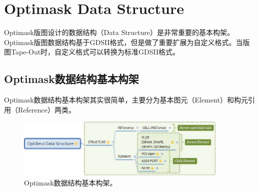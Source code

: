 
\resetdatestamp %


\chapter{Optimask Data Structure} \label{ChMaskDataStruct}

\pagestyle{fancy}
\fancyhead[RO,RE]{}
\fancyhead[LE]{\MakeUppercase{\leftmark}}
\fancyhead[LO]{\MakeUppercase{\rightmark}}
\fancyfoot[C]{\thepage}

Optimask版图设计的数据结构（Data Structure）是非常重要的基本构架。Optimask版图数据结构基于GDSII格式，但是做了重要扩展为自定义格式。当版图Tape-Out时，自定义格式可以转换为标准GDSII格式。

\section{Optimask数据结构基本构架} \label{SectDataStruct}
Optimask数据结构基本构架其实很简单，主要分为基本图元（Element）和构元引用（Reference）两类。

\begin{figure}[htb!p] %
	\centering
	\includegraphics[width=4in]{./Layout/FigsData/Structure.eps}
	\caption{Optimask数据结构基本构架。}
	\label{FigDataStruct}
\end{figure}

